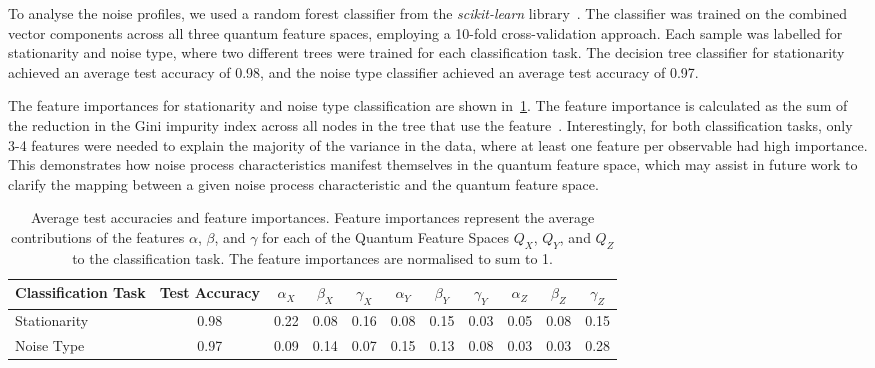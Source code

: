 \documentclass[12pt]{iopart}
\begin{document}
To analyse the noise profiles, we used a random forest classifier from the \textit{scikit-learn} library~\cite{scikit-learn}. The classifier was trained on the combined vector components across all three quantum feature spaces, employing a 10-fold cross-validation approach. Each sample was labelled for stationarity and noise type, where two different trees were trained for each classification task. The decision tree classifier for stationarity achieved an average test accuracy of 0.98, and the noise type classifier achieved an average test accuracy of 0.97.

The feature importances for stationarity and noise type classification are shown in~\cref{tab:feature_importances}. The feature importance is calculated as the sum of the reduction in the Gini impurity index across all nodes in the tree that use the feature~\cite{scikit-learn}. Interestingly, for both classification tasks, only 3-4 features were needed to explain the majority of the variance in the data, where at least one feature per observable had high importance. This demonstrates how noise process characteristics manifest themselves in the quantum feature space, which may assist in future work to clarify the mapping between a given noise process characteristic and the quantum feature space.

\begin{table}[h]
    \centering
    \begin{tabular}{|l|c|c c c|c c c|c c c|}
        \hline
        Classification Task & Test Accuracy & \(\alpha_X\) & \(\beta_X\) & \(\gamma_X\) & \(\alpha_Y\) & \(\beta_Y\) & \(\gamma_Y\) & \(\alpha_Z\) & \(\beta_Z\) & \(\gamma_Z\) \\ \hline
        Stationarity        & 0.98          & 0.22         & 0.08        & 0.16         & 0.08         & 0.15        & 0.03         & 0.05         & 0.08        & 0.15         \\ \hline
        Noise Type          & 0.97          & 0.09         & 0.14        & 0.07         & 0.15         & 0.13        & 0.08         & 0.03         & 0.03        & 0.28         \\ \hline
    \end{tabular}
    \caption{Average test accuracies and feature importances. Feature importances represent the average contributions of the features \(\alpha\), \(\beta\), and \(\gamma\) for each of the Quantum Feature Spaces \(Q_X\), \(Q_Y\), and \(Q_Z\) to the classification task. The feature importances are normalised to sum to 1.}
    \label{tab:feature_importances}
\end{table}
\end{document}
